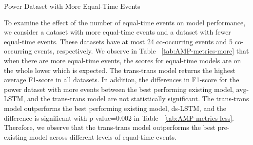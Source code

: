 \documentclass[reqno ,11pt]{article}
\begin{document}
\begin{table}[H]
\parbox{.45\linewidth}{
\centering
\caption{Power Dataset with More Equal-Time Events}
\label{tab:AMP-metrics-more}
}
\hfill
\parbox{.45\linewidth}{
\centering

\caption{Power Dataset with Fewer Equal Time Events}
\label{tab:AMP-metrics-less}
}
\end{table}

To examine the effect of the number of equal-time events on model performance, we consider a dataset with more equal-time events and a dataset with fewer equal-time events. These datasets have at most 24 co-occurring events and 5 co-occurring events, respectively. We observe in Table ~\ref{tab:AMP-metrics-more} that when there are more equal-time events, the scores for equal-time models are on the whole lower which is expected. The trans-trans model returns the highest average F1-score in all datasets. In addition, the differences in F1-score for the power dataset with more events between the best performing existing model, avg-LSTM, and the trans-trans model are not statistically significant. The trans-trans model outperforms the best performing existing model, ds-LSTM, and the difference is significant with p-value=0.002 in Table ~\ref{tab:AMP-metrics-less}. Therefore, we observe that the trans-trans model outperforms the best pre-existing model across different levels of equal-time events. 
\end{document}
